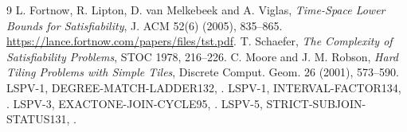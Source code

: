 \documentclass[11pt]{article}
\begin{document}
\begin{thebibliography}{9}
 L. Fortnow, R. Lipton, D. van Melkebeek and A. Viglas, \emph{Time-Space Lower Bounds for Satisfiability}, J. ACM 52(6) (2005), 835--865. \url{https://lance.fortnow.com/papers/files/tst.pdf}.
 T. Schaefer, \emph{The Complexity of Satisfiability Problems}, STOC 1978, 216--226.
 C. Moore and J. M. Robson, \emph{Hard Tiling Problems with Simple Tiles}, Discrete Comput. Geom. 26 (2001), 573--590.
 LSPV-1, DEGREE-MATCH-LADDER132, .
 LSPV-1, INTERVAL-FACTOR134, .
 LSPV-3, EXACTONE-JOIN-CYCLE95, .
 LSPV-5, STRICT-SUBJOIN-STATUS131, .
\end{thebibliography}
\end{document}
